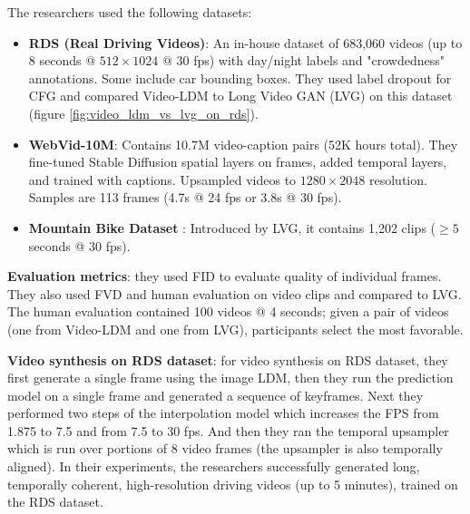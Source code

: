 The researchers used the following datasets:

\begin{itemize}
    \item \textbf{RDS (Real Driving Videos)}: An in-house dataset of 683,060 videos (up to 8 seconds @ $512\times 1024$ @ 30 fps) with day/night labels and "crowdedness" annotations. Some include car bounding boxes. They used label dropout for CFG and compared Video-LDM to Long Video GAN (LVG) on this dataset (figure \ref{fig:video_ldm_vs_lvg_on_rds}).
    \item \textbf{WebVid-10M}: Contains 10.7M video-caption pairs (52K hours total). They fine-tuned Stable Diffusion spatial layers on frames, added temporal layers, and trained with captions. Upsampled videos to $1280\times 2048$ resolution. Samples are 113 frames (4.7s @ 24 fps or 3.8s @ 30 fps).
    \item \textbf{Mountain Bike Dataset} \cite{brooks2022generating}: Introduced by LVG, it contains 1,202 clips ($\geq 5$ seconds @ 30 fps).
\end{itemize}

\textbf{Evaluation metrics}: they used FID to evaluate quality of individual frames. They also used FVD and human evaluation on video clips and compared to LVG. The human evaluation contained 100 videos @ 4 seconds; given a pair of videos (one from Video-LDM and one from LVG), participants select the most favorable.

\textbf{Video synthesis on RDS dataset}: for video synthesis on RDS dataset, they first generate a single frame using the image LDM, then they run the prediction model on a single frame and generated a sequence of keyframes. Next they performed two steps of the interpolation model which increases the FPS from 1.875 to 7.5 and from 7.5 to 30 fps. And then they ran the temporal upsampler which is run over portions of 8 video frames (the upsampler is also temporally aligned). In their experiments, the researchers successfully generated long, temporally coherent, high-resolution driving videos (up to 5 minutes), trained on the RDS dataset.

